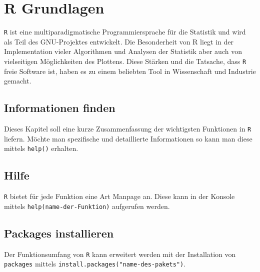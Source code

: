 



\chapter{R Grundlagen}
\lstinline{R} ist eine multiparadigmatische Programmiersprache für 
die Statistik und wird als Teil des GNU-Projektes entwickelt. Die 
Besonderheit von R liegt in der Implementation vieler Algorithmen
und Analysen der Statistik aber auch von vielseitigen Möglichkeiten 
des Plottens. Diese Stärken und die Tatsache, dass \lstinline{R} 
freie Software ist, haben es zu einem beliebten Tool in Wissenschaft
und Industrie gemacht.

\newpage


\section*{Informationen finden}
Dieses Kapitel soll eine kurze Zusammenfassung der wichtigsten 
Funktionen in \lstinline{R} liefern. Möchte man spezifische und
detaillierte Informationen so kann man diese mittels \lstinline{help()}
erhalten. 

\section{Hilfe}
\lstinline{R} bietet für jede Funktion eine Art Manpage an. 
Diese kann in der Konsole mittels \lstinline{help(name-der-Funktion)}
aufgerufen werden. 

\section{Packages installieren}
Der Funktionsumfang von \lstinline{R} kann erweitert werden mit der
Installation von \lstinline{packages} mittels 
\lstinline{install.packages("name-des-pakets")}.

